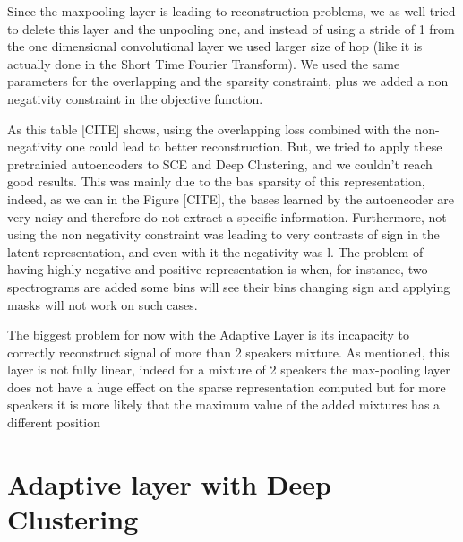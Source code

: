 \documentclass[master,final,11pt]{iscs-thesis}
\begin{document}
Since the maxpooling layer is leading to reconstruction problems, we as well tried to delete this layer and the unpooling one, and instead of using a stride of 1 from the one dimensional convolutional layer we used larger size of hop (like it is actually done in the Short Time Fourier Transform). We used the same parameters for the overlapping and the sparsity constraint, plus we added a non negativity constraint in the objective function.

As this table [CITE] shows, using the overlapping loss combined with the non-negativity one could lead to better reconstruction. But, we tried to apply these pretrainied autoencoders to SCE and Deep Clustering, and we couldn't reach good results. This was mainly due to the bas sparsity of this representation, indeed, as we can in the Figure [CITE], the bases learned by the autoencoder are very noisy and therefore do not extract a specific information. Furthermore, not using the non negativity constraint was leading to very contrasts of sign in the latent representation, and even with it the negativity was l. The problem of having highly negative and positive representation is when, for instance, two spectrograms are added some bins will see their bins changing sign and applying masks will not work on such cases.

The biggest problem for now with the Adaptive Layer is its incapacity to correctly reconstruct signal of more than 2 speakers mixture. As mentioned, this layer is not fully linear, indeed for a mixture of 2 speakers the max-pooling layer does not have a huge effect on the sparse representation computed but for more speakers it is more likely that the maximum value of the added mixtures has a different position

\section{Adaptive layer with Deep Clustering}
\end{document}

